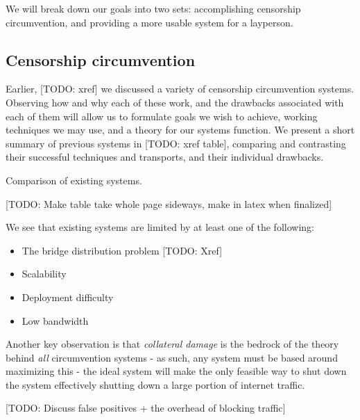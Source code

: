 \documentclass[12pt]{report}
\begin{document}
We will break down our goals into two sets: accomplishing censorship circumvention, and providing a more usable system for a layperson.

\subsection{Censorship circumvention}

Earlier, [TODO: xref] we discussed a variety of censorship circumvention systems. Observing how and why each of these work, and the drawbacks associated with each of them will allow us to formulate goals we wish to achieve, working techniques we may use, and a theory for our systems function. We present a short summary of previous systems in [TODO: xref table], comparing and contrasting their successful techniques and transports, and their individual drawbacks.

\begin{table}
\caption{Comparison of existing systems.}
\begin{center}
[TODO: Make table take whole page sideways, make in latex when finalized]
\end{center}
\end{table}

We see that existing systems are limited by at least one of the following:
\begin{itemize}
  \item The bridge distribution problem [TODO: Xref]
  \item Scalability
  \item Deployment difficulty
  \item Low bandwidth
\end{itemize}

Another key observation is that \emph{collateral damage} is the bedrock of the theory behind \emph{all} circumvention systems - as such, any system must be based around maximizing this - the ideal system will make the only feasible way to shut down the system effectively shutting down a large portion of internet traffic. 

[TODO: Discuss false positives + the overhead of blocking traffic]
\end{document}

